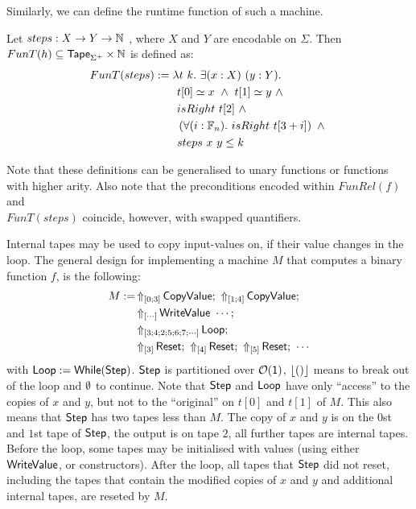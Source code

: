 Similarly, we can define the runtime function of such a machine.
\begin{definition}
  \label{def:Computes2_T}
  Let $steps : X \rightarrow Y \rightarrow \mathbb{N}$ , where $X$ and $Y$ are encodable on $\Sigma$.  Then $FunT(h) \subseteq \mathsf{Tape}_{\Sigma^+} \times \mathbb{N}$ is defined as:
  \begin{alignat*}{2}
     FunT(steps) &:= \lambda t~k.~\exists (x:X)~(y:Y). \\
    &\qquad t[0] \simeq x ~\land~ t[1] \simeq y ~\land~ \\
    &\qquad isRight~t[2] ~\land~ \\
    &\qquad \left(\forall (i:\mathbb{F}_n).~isRight~t[3+i] \right) ~\land~ \\
    &\qquad steps~x~y \leq k
  \end{alignat*}
\end{definition}

Note that these definitions can be generalised to unary functions or functions with higher arity.  Also note that the preconditions encoded within
$FunRel(f)$ and \\
$FunT(steps)$ coincide, however, with swapped quantifiers.

Internal tapes may be used to copy input-values on, if their value changes in the loop.  The general design for implementing a machine $M$ that
computes a binary function $f$, is the following:
\begin{align*}
  M := & \LiftTapes{\MS{CopyValue}}{\Vector{0; 3}} \Seq \LiftTapes{\MS{CopyValue}}{\Vector{1; 4}} \Seq \\
       & \LiftTapes{\MS{WriteValue}~\cdots}{\Vector{\cdots}} \Seq \\
       & \LiftTapes{\MS{Loop}}{\Vector{3; 4; 2; 5; 6; 7; \cdots}} \Seq \\
       & \LiftTapes{\MS{Reset}}{\Vector{3}} \Seq \LiftTapes{\MS{Reset}}{\Vector{4}} \Seq \LiftTapes{\MS{Reset}}{\Vector{5}} \Seq \cdots
\end{align*}
with $\mathsf{Loop} := \mathsf{While}(\mathsf{Step})$.  $\mathsf{Step}$ is partitioned over $\mathcal{O}(\mathsf{1})$, $\left\lfloor {\ensuremath{\mathsf{()}}} \right\rfloor$ means to break out of the loop and $\emptyset$ to
continue.  Note that $\mathsf{Step}$ and $\mathsf{Loop}$ have only ``access'' to the copies of $x$ and $y$, but not to the ``original'' on $t[0]$ and $t[1]$
of $M$.  This also means that $\mathsf{Step}$ has two tapes less than $M$.  The copy of $x$ and $y$ is on the $0$st and $1$st tape of $\mathsf{Step}$, the
output is on tape $2$, all further tapes are internal tapes.  Before the loop, some tapes may be initialised with values (using either
$\mathsf{WriteValue}$, or constructors).  After the loop, all tapes that $\mathsf{Step}$ did not reset, including the tapes that contain the modified copies
of $x$ and $y$ and additional internal tapes, are reseted by $M$.

